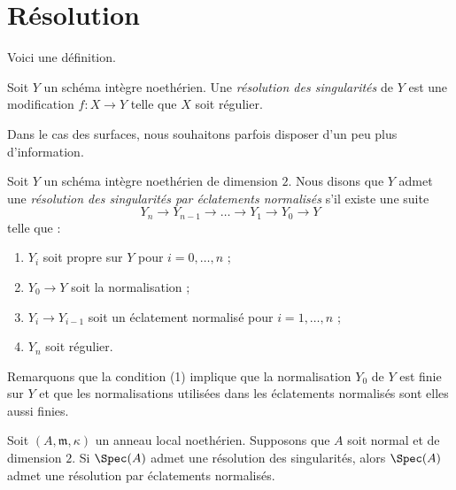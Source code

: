 










\section{Résolution} \label{section-resolution}



\noindent Voici une définition.

\begin{definition} \label{definition-resolution} Soit $Y$ un schéma intègre noethérien. Une {\it résolution des singularités} de $Y$ est une modification $f : X \to Y$ telle que $X$ soit régulier. \end{definition}

\noindent Dans le cas des surfaces, nous souhaitons parfois disposer d'un peu plus d'information.

\begin{definition} \label{definition-resolution-surface} Soit $Y$ un schéma intègre noethérien de dimension $2$. Nous disons que $Y$ admet une {\it résolution des singularités par éclatements normalisés} s'il existe une suite $$
Y_n \to Y_{n - 1} \to \ldots \to Y_1 \to Y_0 \to Y
$$ telle que : \begin{enumerate} \item $Y_i$ soit propre sur $Y$ pour $i = 0, \ldots, n$ ; \item $Y_0 \to Y$ soit la normalisation ; \item $Y_i \to Y_{i - 1}$ soit un éclatement normalisé pour $i = 1, \ldots, n$ ; \item $Y_n$ soit régulier. \end{enumerate} \end{definition}

\noindent Remarquons que la condition (1) implique que la normalisation $Y_0$ de $Y$ est finie sur $Y$ et que les normalisations utilisées dans les éclatements normalisés sont elles aussi finies.

\begin{lemma} \label{lemma-existence-implies-existence-by-normalized-blowing-ups} Soit $(A, \mathfrak m, \kappa)$ un anneau local noethérien. Supposons que $A$ soit normal et de dimension $2$. Si $\Spec(A)$ admet une résolution des singularités, alors $\Spec(A)$ admet une résolution par éclatements normalisés. \end{lemma}

